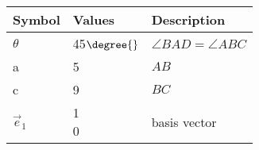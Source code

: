 \begin{tabular}{|p{3cm}|p{3cm}|p{3cm}|}
\hline                                        
\textbf{Symbol} & \textbf{Values} & \textbf{Description}\\                                          
\hline                                 
$\theta$ & 45$\degree{}$   & $\angle{BAD} = \angle{ABC}$ \\           
\hline                                    
a & 5 & $AB$ \\     
\hline                      
c & 9 & $BC$ \\
\hline                                     
		$\vec{e}_1$ & \myvec{
			1\\
			0\\
			} & basis vector\\ 
\hline
\end{tabular}
